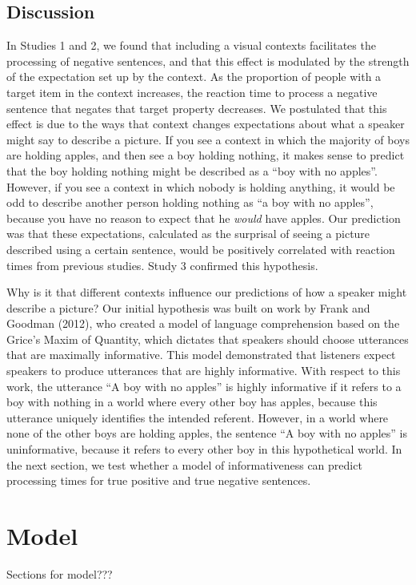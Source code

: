 \documentclass[10pt,letterpaper]{article}
\begin{document}
\subsection{Discussion}

In Studies 1 and 2, we found that including a visual contexts facilitates the processing of negative sentences, and that this effect is modulated by the strength of the expectation set up by the context.  As the proportion of people with a target item in the context increases, the reaction time to process a negative sentence that negates that target property decreases.  We postulated that this effect is due to the ways that context changes expectations about what a speaker might say to describe a picture.  
If you see a context in which the majority of boys are holding apples, and then see a boy holding nothing, it makes sense to predict that the boy holding nothing might be described as a ``boy with no apples''.  However, if you see a context in which nobody is holding anything, it would be odd to describe another person holding nothing as ``a boy with no apples'', because you have no reason to expect that he \emph{would} have apples.  Our prediction was that these expectations, calculated as the surprisal of seeing a picture described using a certain sentence, would be positively correlated with reaction times from previous studies.  Study 3 confirmed this hypothesis.  

Why is it that different contexts influence our predictions of how a speaker might describe a picture?  Our initial hypothesis was built on work by Frank and Goodman (2012), who created a model of language comprehension based on the Grice's Maxim of Quantity, which dictates that speakers should choose utterances that are maximally informative.  This model demonstrated that listeners expect speakers to produce utterances that are highly informative.  With respect to this work, the utterance ``A boy with no apples'' is highly informative if it refers to a boy with nothing in a world where every other boy has apples, because this utterance uniquely identifies the intended referent.  However, in a world where none of the other boys are holding apples, the sentence ``A boy with no apples'' is uninformative, because it refers to every other boy in this hypothetical world.  In the next section, we test whether a model of informativeness can predict processing times for true positive and true negative sentences.  

\section{Model}
Sections for model???
\end{document}

